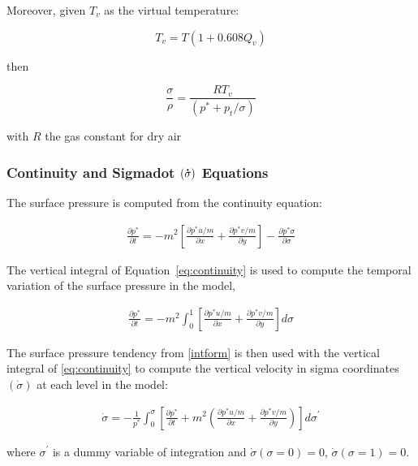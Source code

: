 Moreover, given $T_v$ as the virtual temperature:

\begin{equation}
T_v = T \left( 1 + 0.608 Q_v \right)
\end{equation}

then

\begin{equation}
\frac{\sigma}{\rho} = \frac{RT_v}{(p^{\ast} + p_t/\sigma)}
\end{equation}

with $R$ the gas constant for dry air

\subsubsection{Continuity and Sigmadot $({\bf \dot{\sigma}})$ Equations}

The surface pressure is computed from the continuity equation:

\begin{eqnarray} \label{eq:continuity}
\frac{\partial{p^{\ast}}}{\partial{t}} = 
  -m^2 \left[ \frac{\partial{p^{\ast}u/m}}{\partial{x}} +
        \frac{\partial{p^{\ast}v/m}}{\partial{y}} \right] -
  \frac{\partial{p^{\ast}\dot{\sigma}}}{\partial{\sigma}}
\end{eqnarray}

The vertical integral of Equation~\ref{eq:continuity} is used to
compute the temporal variation of the surface pressure in the model,

\begin{eqnarray}
\label{intform}
  \frac{\partial{p^{\ast}}}{\partial{t}} = -m^2 \int_{0}^{1}
  {\left[ \frac{\partial{p^{\ast}u/m}}{\partial{x}} + 
    \frac{\partial{p^{\ast}v/m}}{\partial{y}} \right] d\sigma}
\end{eqnarray}

The surface pressure tendency from \ref{intform} is then used with
the vertical integral of \ref{eq:continuity} to compute the vertical
velocity in sigma coordinates $(\dot{\sigma})$ at each
level in the model:

\begin{eqnarray}
  \dot{\sigma} = - \frac{1}{p^{\ast}} \int_{0}^{\sigma}{
    \left[ \frac{\partial{p^{\ast}}}{\partial{t}} +
    m^2 \left(\frac{\partial{p^{\ast}u/m}}{\partial{x}} +
                     \frac{\partial{p^{\ast}v/m}}{\partial{y}}
   \right) \right] d\sigma^\prime}
\end{eqnarray}

where $\sigma^\prime$ is a dummy variable of integration and
$\dot{\sigma}(\sigma=0)=0$, $\dot{\sigma}(\sigma=1)= 0$.

